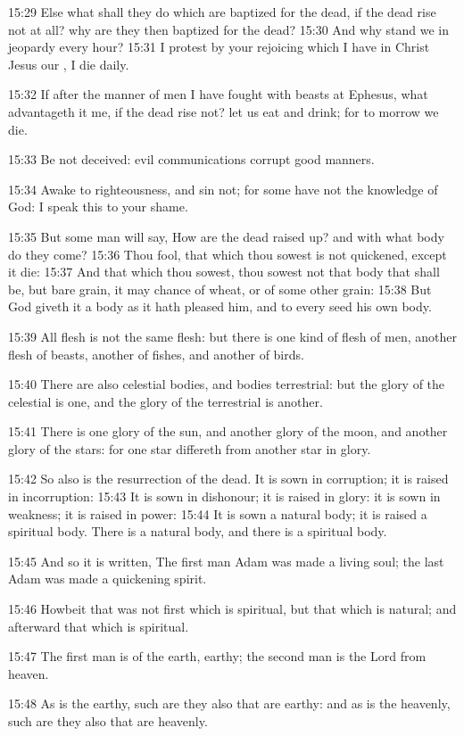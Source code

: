 15:29 Else what shall they do which are baptized for the dead, if the
dead rise not at all? why are they then baptized for the dead?  15:30
And why stand we in jeopardy every hour?  15:31 I protest by your
rejoicing which I have in Christ Jesus our \LORD, I die daily.

15:32 If after the manner of men I have fought with beasts at Ephesus,
what advantageth it me, if the dead rise not? let us eat and drink;
for to morrow we die.

15:33 Be not deceived: evil communications corrupt good manners.

15:34 Awake to righteousness, and sin not; for some have not the
knowledge of God: I speak this to your shame.

15:35 But some man will say, How are the dead raised up? and with what
body do they come?  15:36 Thou fool, that which thou sowest is not
quickened, except it die: 15:37 And that which thou sowest, thou
sowest not that body that shall be, but bare grain, it may chance of
wheat, or of some other grain: 15:38 But God giveth it a body as it
hath pleased him, and to every seed his own body.

15:39 All flesh is not the same flesh: but there is one kind of flesh
of men, another flesh of beasts, another of fishes, and another of
birds.

15:40 There are also celestial bodies, and bodies terrestrial: but the
glory of the celestial is one, and the glory of the terrestrial is
another.

15:41 There is one glory of the sun, and another glory of the moon,
and another glory of the stars: for one star differeth from another
star in glory.

15:42 So also is the resurrection of the dead. It is sown in
corruption; it is raised in incorruption: 15:43 It is sown in
dishonour; it is raised in glory: it is sown in weakness; it is raised
in power: 15:44 It is sown a natural body; it is raised a spiritual
body. There is a natural body, and there is a spiritual body.

15:45 And so it is written, The first man Adam was made a living soul;
the last Adam was made a quickening spirit.

15:46 Howbeit that was not first which is spiritual, but that which is
natural; and afterward that which is spiritual.

15:47 The first man is of the earth, earthy; the second man is the
Lord from heaven.

15:48 As is the earthy, such are they also that are earthy: and as is
the heavenly, such are they also that are heavenly.

